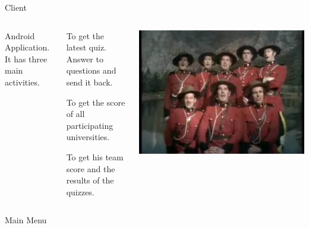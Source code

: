 \documentclass{beamer}
\newlength{\wideitemsep}
\let\olditem\item
\renewcommand{\item}{\setlength{\itemsep}{\wideitemsep}\olditem}
\begin{document}
\begin{frame}{Client}
    \begin{columns}
        Android Application. It has three main activities.
        \begin{description} 
            \pause \item[\bf ChallengeActivity] To get the latest quiz. Answer to questions and send it back.
            \pause \item[\bf UniversityScoreActivity] To get the score of all participating universities. 
            \pause \item[\bf TeamScoreActivity] To get his team score and the results of the quizzes.
        \end{description}
        \includegraphics[width=\textwidth]{python1}
    \end{columns}
\end{frame}

\begin{frame}{Main Menu}
    \begin{center}
    \end{center}
\end{frame}
\end{document}
